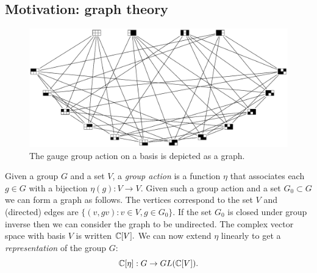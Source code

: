 \documentclass[12pt,notitlepage,longbibliography,nofootinbib,tightenlines]{revtex4}
\begin{document}
%
%

\subsection{Motivation: graph theory}

\begin{figure}[th!]
\begin{center}
        \includegraphics[width=0.9\columnwidth]{fig_compass.pdf}
\caption{
The gauge group action on a basis is depicted as a graph.
}
\label{fig_compass}
\end{center}
\end{figure}

\def\rhoreg{\rho_\mathrm{reg}}

Given a group $G$ and a set $V$,
a {\it group action} 
is a function $\eta$ that associates
each $g\in G$ with a bijection $\eta(g):V\to V.$
Given such a group action and a
set $G_0\subset G$ we can form a graph as
follows.
The vertices correspond to the set $V$ and
(directed) edges are  $\{(v, gv) : v \in V, g \in G_0\}.$
If the set $G_0$ is closed under group inverse then
we can consider the graph to be undirected.
The complex vector space with basis $V$ is written $\mathbb{C}[V].$
We can now extend $\eta$ linearly to get a {\it representation} of
the group $G$:
$$
    \mathbb{C}[\eta] : G \to GL(\mathbb{C}[V]).
$$
\end{document}
